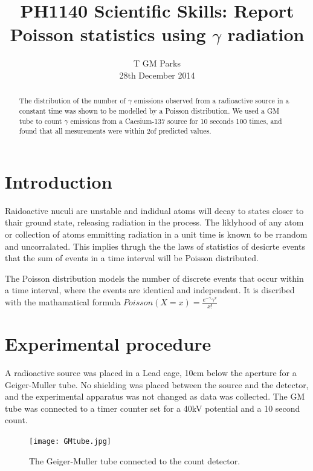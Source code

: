 \documentclass[10pt]{iopart}
\begin{document}
\title[PH1140 Report - T GM Parks]{PH1140 Scientific Skills: Report Poisson statistics using $\gamma$ radiation}

\author{T GM Parks\\28th December 2014}

\begin{abstract}
The distribution of the number of $\gamma$ emissions observed from a radioactive source in a constant time was shown to be modelled by a Poisson distribution. We used a GM tube to count $\gamma$ emissions from a Caesium-137 source for 10 seconds 100 times, and found that all mesurements were within 2\sigma of predicted values.
\end{abstract}


\section{Introduction}

Raidoactive nuculi are unstable and indidual atoms will decay to states closer to thair ground state, releasing radiation in the process. The liklyhood of any atom or collection of atoms emmitting radiation in a unit time is known to be rrandom and uncorralated. This implies thrugh the the laws of statistics of desicrte events that the sum of events in a time interval will be  Poisson distributed.

The Poisson distribution models the number of discrete events that occur within a time interval, where the events are identical and independent. \cite{mathworld} It is discribed with the mathamatical formula $Poisson(X = x) = \frac{e^{-\gamma }\gamma ^{x}}{x!}$ \cite{riley}

\section{Experimental procedure}

A radioactive source was placed in a Lead cage, 10cm below the aperture for a Geiger-Muller tube. No shielding was placed between the source and the detector, and the experimental apparatus was not changed as data was collected. The GM tube was connected to a timer counter set for a 40kV potential and a 10 second count.
\begin{figure}[htbp]
\begin{center}
\texttt{[image: GMtube.jpg]}
\caption{The Geiger-Muller tube connected to the count detector.}
\label{default}
\end{center}
\end{figure}
\end{document}
